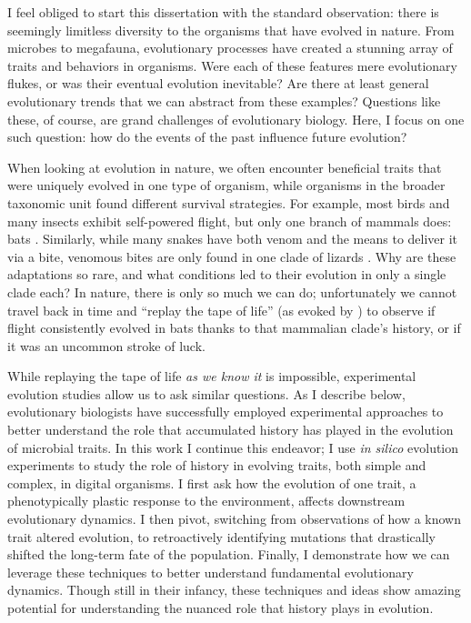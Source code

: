 I feel obliged to start this dissertation with the standard observation:  there is seemingly limitless diversity to the organisms that have evolved in nature. 
From microbes to megafauna, evolutionary processes have created a stunning array of traits and behaviors in organisms. 
Were each of these features mere evolutionary flukes, or was their eventual evolution inevitable?
Are there at least general evolutionary trends that we can abstract from these examples? 
Questions like these, of course, are grand challenges of evolutionary biology. 
Here, I focus on one such question: how do the events of the past influence future evolution?


When looking at evolution in nature, we often encounter beneficial traits that were uniquely evolved in one type of organism, while organisms in the broader taxonomic unit found different survival strategies.
For example, most birds and many insects exhibit self-powered flight, but only one branch of mammals does: bats \citep{gunnellFossilEvidenceOrigin2005}. 
Similarly, while many snakes have both venom and the means to deliver it via a bite, venomous bites are only found in one clade of lizards \citep{fryEarlyEvolutionVenom2006}.
Why are these adaptations so rare, and what conditions led to their evolution in only a single clade each?
In nature, there is only so much we can do; unfortunately we cannot travel back in time and ``replay the tape of life'' (as evoked by \citet{gouldWonderfulLifeBurgess1990}) to observe if flight consistently evolved in bats thanks to that mammalian clade's history, or if it was an uncommon stroke of luck.

While replaying the tape of life \textit{as we know it} is impossible, experimental evolution studies allow us to ask similar questions. 
As I describe below, evolutionary biologists have successfully employed experimental approaches to better understand the role that accumulated history has played in the evolution of microbial traits. 
In this work I continue this endeavor; I use \textit{in silico} evolution experiments to study the role of history in evolving traits, both simple and complex, in digital organisms. 
I first ask how the evolution of one trait, a phenotypically plastic response to the environment, affects downstream evolutionary dynamics. 
I then pivot, switching from observations of how a known trait altered evolution, to retroactively identifying mutations that drastically shifted the long-term fate of the population. 
Finally, I demonstrate how we can leverage these techniques to better understand fundamental evolutionary dynamics. 
Though still in their infancy, these techniques and ideas show amazing potential for understanding the nuanced role that history plays in evolution.